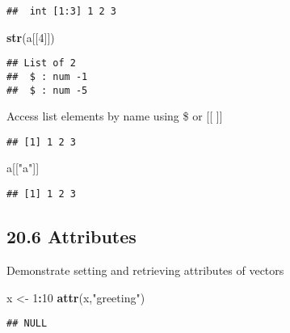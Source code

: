 \documentclass[
]{article}
\newenvironment{Shaded}{\begin{snugshade}}{\end{snugshade}}
\newcommand{\DecValTok}[1]{\textcolor[rgb]{0.00,0.00,0.81}{#1}}
\newcommand{\FunctionTok}[1]{\textcolor[rgb]{0.13,0.29,0.53}{\textbf{#1}}}
\newcommand{\NormalTok}[1]{#1}
\newcommand{\OtherTok}[1]{\textcolor[rgb]{0.56,0.35,0.01}{#1}}
\newcommand{\SpecialCharTok}[1]{\textcolor[rgb]{0.81,0.36,0.00}{\textbf{#1}}}
\newcommand{\StringTok}[1]{\textcolor[rgb]{0.31,0.60,0.02}{#1}}
\begin{document}
\begin{verbatim}
##  int [1:3] 1 2 3
\end{verbatim}

\begin{Shaded}
\begin{Highlighting}[]
\FunctionTok{str}\NormalTok{(a[[}\DecValTok{4}\NormalTok{]])}
\end{Highlighting}
\end{Shaded}

\begin{verbatim}
## List of 2
##  $ : num -1
##  $ : num -5
\end{verbatim}

Access list elements by name using \$ or {[}{[} {]}{]}

\begin{Shaded}
\end{Shaded}

\begin{verbatim}
## [1] 1 2 3
\end{verbatim}

\begin{Shaded}
\begin{Highlighting}[]
\NormalTok{a[[}\StringTok{"a"}\NormalTok{]]}
\end{Highlighting}
\end{Shaded}

\begin{verbatim}
## [1] 1 2 3
\end{verbatim}

\hypertarget{attributes}{%
\subsection{20.6 Attributes}\label{attributes}}

Demonstrate setting and retrieving attributes of vectors

\begin{Shaded}
\begin{Highlighting}[]
\NormalTok{x }\OtherTok{\textless{}{-}} \DecValTok{1}\SpecialCharTok{:}\DecValTok{10}
\FunctionTok{attr}\NormalTok{(x,}\StringTok{"greeting"}\NormalTok{)}
\end{Highlighting}
\end{Shaded}

\begin{verbatim}
## NULL
\end{verbatim}
\end{document}
